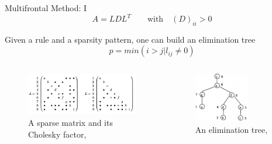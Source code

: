 \begin{frame}[t]{Multifrontal Method: I}
	\small
	\justifying
		\begin{equation} \label{eq:chol-1}
		A = LDL^T \qquad \text{with}\quad (D)_{ii} > 0
		\end{equation}
		
		Given a rule and a sparsity pattern, one can build an elimination tree
		\begin{equation} \label{eq:elimination-tree-1}
			p = min(i > j | l_{ij} \neq 0)
		\end{equation}
		
	
	\vspace{-5mm}
		
	\begin{columns}
		\begin{column}{0.5\textwidth}
			\begin{figure}[!htpb]
				\centering
				\includegraphics[width=1.2\textwidth]{figures/chapter-2/sparsity-pattern-example-mm.png}
				\caption{A sparse matrix and its Cholesky factor, \cite{mult-frontal-original:2}}
				\label{fig:sparsity-pattern-example-mm}
			\end{figure}
		\end{column}
			
		\begin{column}{0.5\textwidth}
			
			\begin{figure}[!htpb]
				\centering
				\includegraphics[width=0.65\textwidth]{figures/chapter-2/elimination-tree-mm.png}
				\caption{An elimination tree, \cite{mult-frontal-original:2}}
				\label{fig:elimination-tree-mm}
			\end{figure}
		\end{column}

	\end{columns}
	
	
\end{frame}


